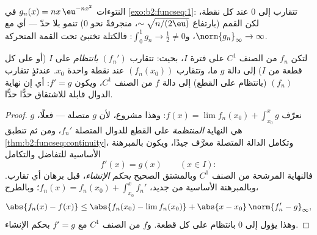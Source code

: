 \begin{omfigure}

{\small النتوءات $g_n(x) = nx\,\eu^{-nx^2}$ في
\cref{exo:b2:funcseq:1}: تتقارب إلى $0$ عند كل نقطة،
لكن القمم (بارتفاع $\sim\sqrt{n/(2\eu)}$، منجرفةً نحو
$0$) تنمو بلا حدّ --- أي  مع
$\norm{g_n}_\infty \to \infty$، و$\int_0^1 g_n \to \frac12
\neq 0$: فالكتلة تختبئ تحت القمة المتحركة.}
\end{omfigure}

\begin{theorem}[الاشتقاق]\label{thm:b2:funcseq:differentiation}
لتكن $f_n$ من الصنف $C^1$ على فترة $I$، بحيث: تتقارب $(f_n')$
\emph{بانتظام} على $I$ (أو على كل قطعة من $I$) إلى دالة $g$ ما،
وتتقارب $(f_n(x_0))$ عند نقطة واحدة $x_0$. عندئذٍ تتقارب $(f_n)$
(بانتظام على القطع) إلى دالة $f$ من الصنف $C^1$، ويكون $f'
= g$: أي إن نهاية الدوال قابلة للاشتقاق حدًّا حدًّا.
\end{theorem}

\begin{proof}
نعرّف $f(x) = \lim f_n(x_0) + \int_{x_0}^x g$: وهذا مشروع، لأن $g$
متصلة --- فعلًا، $g$ هي النهاية \emph{المنتظمة} على
القطع للدوال المتصلة $f_n'$، ومن ثم تنطبق
\cref{thm:b2:funcseq:continuity}، وتكامل الدالة المتصلة
معرَّف جيدًا، ويكون بالمبرهنة الأساسية
للتفاضل والتكامل
\[
f'(x) = g(x) \qquad (x \in I) :
\]
فالنهاية المرشحة من الصنف $C^1$ وبالمشتق الصحيح
\emph{بحكم الإنشاء}، قبل برهان أي تقارب. وبالمبرهنة
الأساسية من جديد، $f_n(x) = f_n(x_0) + \int_{x_0}^x
f_n'$؛ وبالطرح،
\[
\abs{f_n(x) - f(x)} \leq \abs{f_n(x_0) - \lim f_n(x_0)}
+ \abs{x - x_0}\,\norm{f_n' - g}_{\infty} ,
\]
وهذا يؤول إلى $0$ بانتظام على كل قطعة. و$f$ من الصنف $C^1$
مع $f' = g$ بحكم الإنشاء.
\end{proof}

